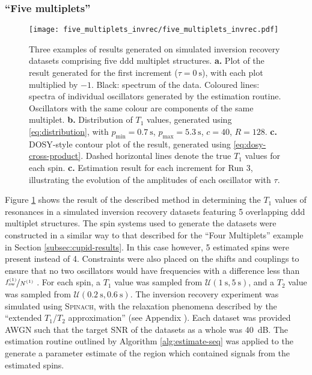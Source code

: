 \subsubsection{``Five multiplets''}
\begin{figure}
    \texttt{[image: five\_multiplets\_invrec/five\_multiplets\_invrec.pdf]}
    \caption[
        Three examples of results generated on simulated inversion recovery
        datasets comprising five ddd multiplet structures.
    ]
    {
        Three examples of results generated on
        simulated inversion recovery datasets comprising five ddd multiplet
        structures.
        \textbf{a.} Plot of the result generated for the first increment ($\tau
        = \qty{0}{\second}$), with each plot multiplied by $-1$. Black:
        spectrum of the data. Coloured lines: spectra of individual oscillators
        generated by the estimation routine. Oscillators with the same colour
        are components of the same multiplet.
        \textbf{b.} Distribution of $T_1$ values, generated using
        \eqref{eq:distribution}, with
        $p_{\text{min}} = \qty{0.7}{\second}$,
        $p_{\text{max}} = \qty{5.3}{\second}$,
        $c = 40$,
        $R=128$.
        \textbf{c.} \ac{DOSY}-style contour plot of the result, generated using
        \eqref{eq:dosy-cross-product}.
        Dashed horizontal lines denote the true $T_1$ values for each spin.
        \textbf{c.} Estimation result for each increment for Run 3,
        illustrating the evolution of the amplitudes of each oscillator with
        $\tau$.
    }
    \label{fig:five-multiplets-invrec}
\end{figure}
Figure \ref{fig:five-multiplets-invrec} shows the result of the described
method in determining the $T_1$ values of resonances in a simulated inversion
recovery datasets featuring 5 overlapping ddd multiplet structures. The spin
systems used to generate the datasets were constructed in a similar way to that
described for the ``Four Multiplets'' example in
Section \ref{subsec:cupid-results}. In this case however, 5 estimated spins were
present instead of 4. Constraints were also placed on the shifts and
couplings to ensure that no two oscillators would have frequencies with a
difference less than $\nicefrac{f_{\mathrm{sw}}^{(1)}}{N^{(1)}}$ . For each spin, a $T_1$ value
was sampled from $\mathcal{U}(\qty{1}{\second}, \qty{5}{\second})$, and a $T_2$
value was sampled from  $\mathcal{U}(\qty{0.2}{\second}, \qty{0.6}{\second})$.
The inversion recovery experiment was simulated using \textsc{Spinach}, with the
relaxation phenomena described by the ``extended $T_1$/$T_2$
approximation'' (see Appendix ).
Each dataset was provided \ac{AWGN} such that the target \ac{SNR} of the
datasets as a whole was \qty{40}{\deci\bel}.
The estimation routine outlined by Algorithm \ref{alg:estimate-seq} was applied
to the generate a parameter estimate of the region which contained signals from
the estimated spins.

